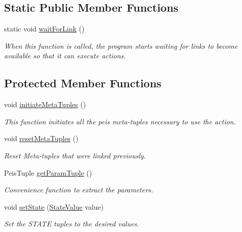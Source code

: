 \subsection*{\-Static \-Public \-Member \-Functions}
\begin{DoxyCompactItemize}
\item 
static void \hyperlink{classexekutor_1_1ActionExekutor_a1aa23235e75f6c59983115b9e3c4dbfd}{wait\-For\-Link} ()
\begin{DoxyCompactList}\small\item\em \-When this function is called, the program starts waiting for links to become available so that it can execute actions. \end{DoxyCompactList}\end{DoxyCompactItemize}
\subsection*{\-Protected \-Member \-Functions}
\begin{DoxyCompactItemize}
\item 
void \hyperlink{classexekutor_1_1ActionExekutor_ae2f81a4994766a040bf6fa1cf36fbfb5}{initiate\-Meta\-Tuples} ()
\begin{DoxyCompactList}\small\item\em \-This function initiates all the peis meta-\/tuples necessary to use the action. \end{DoxyCompactList}\item 
void \hyperlink{classexekutor_1_1ActionExekutor_a73b5509aeadf1d592b3b2b27bd9ce2ae}{reset\-Meta\-Tuples} ()
\begin{DoxyCompactList}\small\item\em \-Reset \-Meta-\/tuples that were linked previously. \end{DoxyCompactList}\item 
\-Peis\-Tuple \hyperlink{classexekutor_1_1ActionExekutor_ac1e62ad386692ab2cd7e8ae2173f1eb5}{get\-Param\-Tuple} ()
\begin{DoxyCompactList}\small\item\em \-Convenience function to extract the parameters. \end{DoxyCompactList}\item 
void \hyperlink{classexekutor_1_1ActionExekutor_a47056dd4cb829acdbfd6a43378d3f332}{set\-State} (\hyperlink{namespaceexekutor_a82e43e24945d434a81cc5d50282a0e6d}{\-State\-Value} value)
\begin{DoxyCompactList}\small\item\em \-Set the \-S\-T\-A\-T\-E tuples to the desired values. \end{DoxyCompactList}\end{DoxyCompactItemize}
